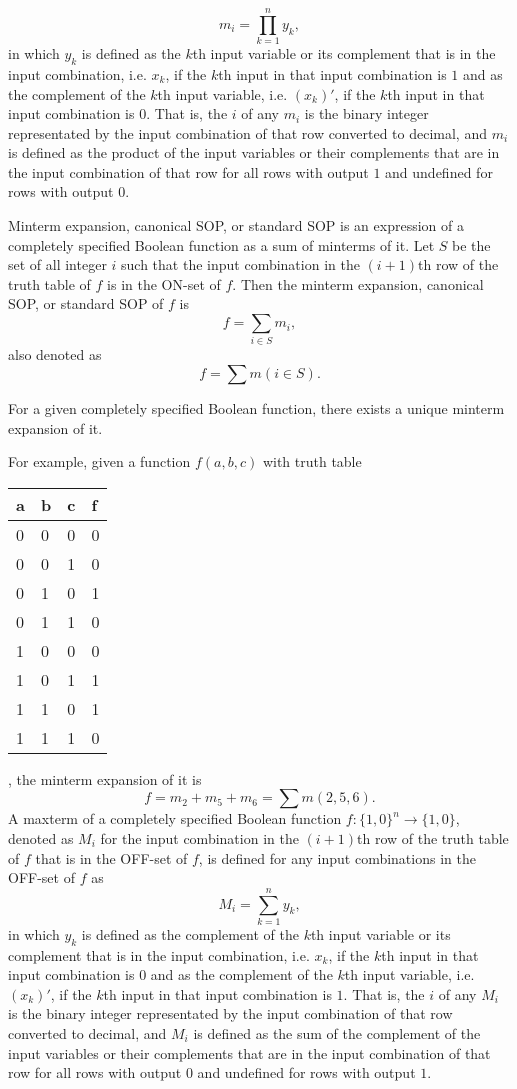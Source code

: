 \documentclass[a4paper,12pt]{article}
\begin{document}
\begin{itemize}
\begin{itemize}
\begin{itemize}
\begin{itemize}
\begin{itemize}
\begin{itemize}
\begin{itemize}
\[m_i=\prod_{k=1}^ny_k,\]
in which $y_k$ is defined as the $k$th input variable or its complement that is in the input combination, i.e. $x_k$, if the $k$th input in that input combination is $1$ and as the complement of the $k$th input variable, i.e. $(x_k)'$, if the $k$th input in that input combination is $0$. That is, the $i$ of any $m_i$ is the binary integer representated by the input combination of that row converted to decimal, and $m_i$ is defined as the product of the input variables or their complements that are in the input combination of that row for all rows with output $1$ and undefined for rows with output $0$.

Minterm expansion, canonical SOP, or standard SOP is an expression of a completely specified Boolean function as a sum of minterms of it. Let $S$ be the set of all integer $i$ such that the input combination in the $(i+1)$th row of the truth table of $f$ is in the ON-set of $f$. Then the minterm expansion, canonical SOP, or standard SOP of $f$ is
\[f=\sum_{i\in S}m_i,\]
also denoted as
\[f=\sum m(i\in S).\]

For a given completely specified Boolean function, there exists a unique minterm expansion of it.

For example, given a function $f(a,b,c)$ with truth table
\begin{longtable}[c]{|m|m|m|m|}
\hline
a & b & c & f\\\hline
0 & 0 & 0 & 0\\\hline
0 & 0 & 1 & 0\\\hline
0 & 1 & 0 & 1\\\hline
0 & 1 & 1 & 0\\\hline
1 & 0 & 0 & 0\\\hline
1 & 0 & 1 & 1\\\hline
1 & 1 & 0 & 1\\\hline
1 & 1 & 1 & 0\\\hline
\end{longtable}
, the minterm expansion of it is
\[f=m_2+m_5+m_6=\sum m(2,5,6).\]
A maxterm of a completely specified Boolean function $f\colon\{1,0\}^n\to\{1,0\}$, denoted as $M_i$ for the input combination in the $(i+1)$th row of the truth table of $f$ that is in the OFF-set of $f$, is defined for any input combinations in the OFF-set of $f$ as
\[M_i=\sum_{k=1}^ny_k,\]
in which $y_k$ is defined as the complement of the $k$th input variable or its complement that is in the input combination, i.e. $x_k$, if the $k$th input in that input combination is $0$ and as the complement of the $k$th input variable, i.e. $(x_k)'$, if the $k$th input in that input combination is $1$. That is, the $i$ of any $M_i$ is the binary integer representated by the input combination of that row converted to decimal, and $M_i$ is defined as the sum of the complement of the input variables or their complements that are in the input combination of that row for all rows with output $0$ and undefined for rows with output $1$.


\end{itemize}
\end{itemize}
\end{itemize}
\end{itemize}
\end{itemize}
\end{itemize}
\end{itemize}
\end{document}
